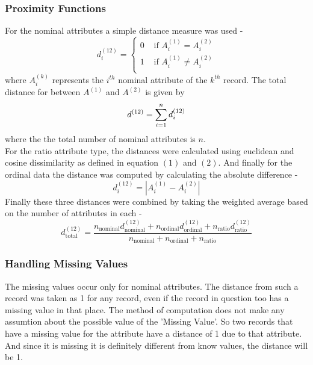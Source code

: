 \subsubsection{Proximity Functions}
For the nominal attributes a simple distance measure was used - 
\begin{equation*}
d^{(12)}_i = \begin{cases} 
      0 & \textrm{ if $A_i^{(1)} = A_i^{(2)}$} \\
      1 & \textrm{ if $A_i^{(1)} \neq A_i^{(2)}$} \\
   \end{cases}
\end{equation*}
where $A^{(k)}_i$ represents the $i^{th}$ nominal attribute of the $k^{th}$ record. The total distance for between $A^{(1)}$ and $A^{(2)}$ is given by 
\begin{equation*}
	d^{(12)} = \sum^n_{i=1} d^{(12)}_i\\
\end{equation*}
where the the total number of nominal attributes is $n$. \\
For the ratio attribute type, the distances were calculated using euclidean and cosine dissimilarity as defined in equation $(1)$ and $(2)$. And finally for the ordinal data the distance was computed by calculating the absolute difference -
\begin{equation*}
	d^{(12)}_i = |A_i^{(1)} - A_i^{(2)}|
\end{equation*}
Finally these three distances were combined by taking the weighted average based on the number of attributes in each -
\begin{equation*}
	d^{(12)}_{\textrm{total}} = \frac{n_{\textrm{nominal}}d^{(12)}_{\textrm{nominal}} + n_{\textrm{ordinal}}d^{(12)}_{\textrm{ordinal}} + n_{\textrm{ratio}}d^{(12)}_{\textrm{ratio}}}{n_{\textrm{nominal}} + n_{\textrm{ordinal}} + n_{\textrm{ratio}}}
\end{equation*}

\subsubsection{Handling Missing Values}
The missing values occur only for nominal attributes. The distance from such a record was taken as 1 for any record, even if the record in question too has a missing value in that place. The method of computation does not make any assumtion about the possible value of the 'Missing Value'. So two records that have a missing value for the attribute have a distance of 1 due to that attribute. And since it is missing it is definitely different from know values, the distance will be 1.\\


